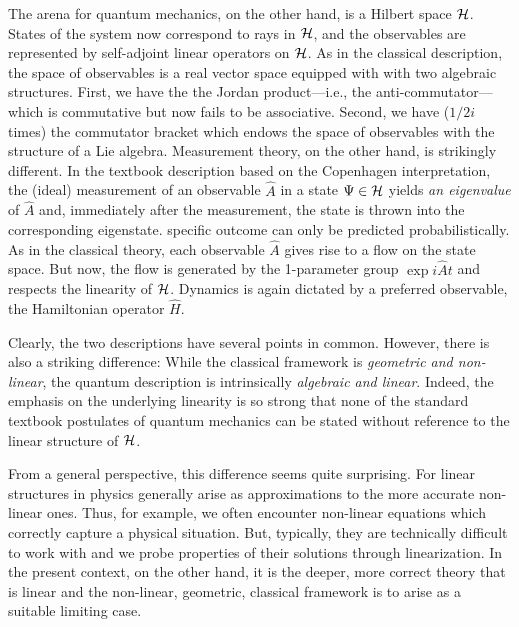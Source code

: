 The arena for quantum mechanics, on the other hand, is a Hilbert space
${\cal H}$.  States of the system now correspond to rays in ${\cal H}$, and the
observables are represented by self-adjoint linear operators on
${\cal H}$. As in the classical description, the space of observables is a
real vector space equipped with with two algebraic structures. First,
we have the the Jordan product---i.e., the anti-commutator---which is
commutative but now fails to be associative. Second, we have ($1/2i$
times) the commutator bracket which endows the space of observables
with the structure of a Lie algebra.  Measurement theory, on the other
hand, is strikingly different. In the textbook description based on
the Copenhagen interpretation, the (ideal) measurement of an
observable $\hat{A}$ in a state $\Psi \in {\cal H}$ yields {\it an
eigenvalue} of $\hat{A}$ and, immediately after the measurement, the
state is thrown into the corresponding eigenstate.%
specific outcome can only be predicted probabilistically. As in the
classical theory, each observable $\hat{A}$ gives rise to a flow on
the state space. But now, the flow is generated by the 1-parameter
group $\exp i\hat{A}t$ and respects the linearity of ${\cal H}$.  Dynamics
is again dictated by a preferred observable, the Hamiltonian operator
$\hat{H}$.

Clearly, the two descriptions have several points in common.  However,
there is also a striking difference: While the classical framework is
{\it geometric and non-linear}, the quantum description is
intrinsically {\it algebraic and linear}. Indeed, the emphasis on the
underlying linearity is so strong that none of the standard textbook
postulates of quantum mechanics can be stated without reference to the
linear structure of ${\cal H}$.

{}From a general perspective, this difference seems quite surprising.
For linear structures in physics generally arise as approximations to
the more accurate non-linear ones. Thus, for example, we often
encounter non-linear equations which correctly capture a physical
situation. But, typically, they are technically difficult to work with
and we probe properties of their solutions through linearization.  In
the present context, on the other hand, it is the deeper, more correct
theory that is linear and the non-linear, geometric, classical
framework is to arise as a suitable limiting case.

